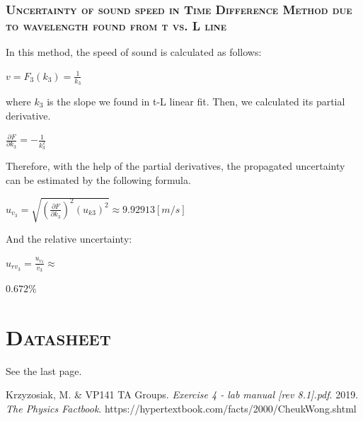 \documentclass[a4paper,12pt]{article}
\begin{document}
\begin{appendices}
		\subsubsection{\textsc{Uncertainty of sound speed in Time Difference Method due to wavelength found from t vs. L line}}
		In this method, the speed of sound is calculated as follows: 
		\begin{center}
		$\displaystyle v = F_3(k_3) = \frac{1}{k_3}$
		\end{center}
		\par
		where $k_3$ is the slope we found in t-L linear fit. Then, we calculated its partial derivative.
		\begin{center}
		$\displaystyle\frac{\partial F}{\partial k_3} = -\frac{1}{k_3^2}$\\
		\end{center}
		\par
		Therefore, with the help of the partial derivatives, the propagated uncertainty can be estimated by the following formula.
		\begin{center}
		$\displaystyle u_{v_3} = \sqrt{(\frac{\partial F}{\partial k_3})^2(u_{k3})^2} \approx 9.92913 [m/s]$
		\end{center}
		\par
		And the relative uncertainty:
		\begin{center}
		\begin{large}
		$\displaystyle u_{rv_3} = \frac{u_{v_3}}{\bar v_3} \approx$
		\end{large}
		$ 0.672\% $
		\end{center}
		
      \section{\textsc{Datasheet}} 
      See the last page.
  \end{appendices} 


\begin{thebibliography}{9}
 Krzyzosiak, M. \& VP141 TA Groups.
\textit{Exercise 4 - lab manual [rev 8.1].pdf}. 
2019.
 \textit{The Physics Factbook}. https://hypertextbook.com/facts/2000/CheukWong.shtml
\end{thebibliography}


\end{document}
